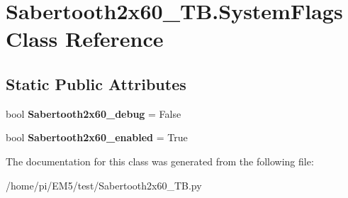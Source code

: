 \hypertarget{classSabertooth2x60__TB_1_1SystemFlags}{}\section{Sabertooth2x60\+\_\+\+T\+B.\+System\+Flags Class Reference}
\label{classSabertooth2x60__TB_1_1SystemFlags}
\subsection*{Static Public Attributes}
\begin{DoxyCompactItemize}
\item 
\mbox{\label{classSabertooth2x60__TB_1_1SystemFlags_ad43d3efdf9d3d34e2fcb0241e9ad24a4}} 
bool {\bfseries Sabertooth2x60\+\_\+debug} = False
\item 
\mbox{\label{classSabertooth2x60__TB_1_1SystemFlags_a9af37ea4a254cb3d57b8a227f633dafb}} 
bool {\bfseries Sabertooth2x60\+\_\+enabled} = True
\end{DoxyCompactItemize}


The documentation for this class was generated from the following file\+:\begin{DoxyCompactItemize}
\item 
/home/pi/\+E\+M5/test/Sabertooth2x60\+\_\+\+T\+B.\+py\end{DoxyCompactItemize}
